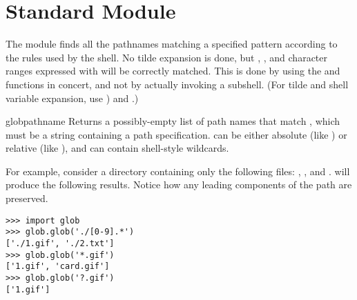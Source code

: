 \section{Standard Module }
\label{module-glob}
\renewcommand{\indexsubitem}{(in module glob)}

The  module finds all the pathnames matching a specified
pattern according to the rules used by the \UNIX{} shell.  No tilde
expansion is done, but \code{*}, , and character ranges
expressed with \code{[]} will be correctly matched.  This is done by
using the  and  functions
in concert, and not by actually invoking a subshell.  (For tilde and
shell variable expansion, use ) and
.)

\begin{funcdesc}{glob}{pathname}
Returns a possibly-empty list of path names that match ,
which must be a string containing a path specification.
 can be either absolute (like
) or relative (like
), and can contain shell-style wildcards.
\end{funcdesc}

For example, consider a directory containing only the following files:
, , and .  
will produce the following results.  Notice how any leading components
of the path are preserved.

\bcode\begin{verbatim}
>>> import glob
>>> glob.glob('./[0-9].*')
['./1.gif', './2.txt']
>>> glob.glob('*.gif')
['1.gif', 'card.gif']
>>> glob.glob('?.gif')
['1.gif']
\end{verbatim}\ecode
